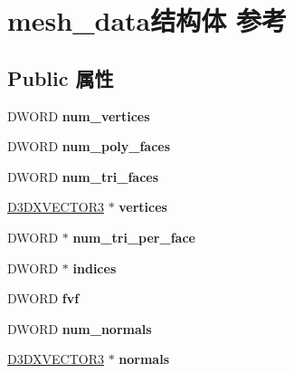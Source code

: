 \hypertarget{structmesh__data}{}\section{mesh\+\_\+data结构体 参考}
\label{structmesh__data}
\subsection*{Public 属性}
\begin{DoxyCompactItemize}
\item 
\mbox{\label{structmesh__data_afd81982ae82945e6fdc9e045fdfaa8a7}} 
D\+W\+O\+RD {\bfseries num\+\_\+vertices}
\item 
\mbox{\label{structmesh__data_a6f61fb0b629c9af1c159001ccc78e3e2}} 
D\+W\+O\+RD {\bfseries num\+\_\+poly\+\_\+faces}
\item 
\mbox{\label{structmesh__data_aae1b504f084fc447e2ef5c1354d86d4c}} 
D\+W\+O\+RD {\bfseries num\+\_\+tri\+\_\+faces}
\item 
\mbox{\label{structmesh__data_a3c6a3a0af8351b0579bc468e454b2c68}} 
\hyperlink{struct___d3_d_v_e_c_t_o_r}{D3\+D\+X\+V\+E\+C\+T\+O\+R3} $\ast$ {\bfseries vertices}
\item 
\mbox{\label{structmesh__data_a7b1ff72c081c932bf285c4bce4b89e0c}} 
D\+W\+O\+RD $\ast$ {\bfseries num\+\_\+tri\+\_\+per\+\_\+face}
\item 
\mbox{\label{structmesh__data_af0c00923b0e9a2293c554722fc33c903}} 
D\+W\+O\+RD $\ast$ {\bfseries indices}
\item 
\mbox{\label{structmesh__data_a6036ed34b430c2eddf02a5dd4080b7ac}} 
D\+W\+O\+RD {\bfseries fvf}
\item 
\mbox{\label{structmesh__data_a5426b2bfba00333449f3bc9a18c82148}} 
D\+W\+O\+RD {\bfseries num\+\_\+normals}
\item 
\mbox{\label{structmesh__data_acafb9e5359039c17d3b1c07577724395}} 
\hyperlink{struct___d3_d_v_e_c_t_o_r}{D3\+D\+X\+V\+E\+C\+T\+O\+R3} $\ast$ {\bfseries normals}

\end{DoxyCompactItemize}
